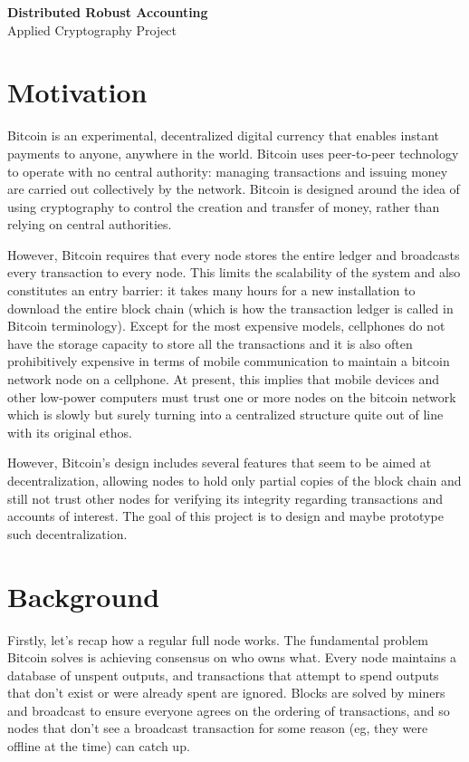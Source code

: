 \documentclass[a4paper,12pt]{article}
\begin{document}
\pagestyle{empty}
\begin{center}
\LARGE{\textbf{Distributed Robust Accounting}}\\
\vspace{0.5cm}
\large{Applied Cryptography Project}\\
\vspace{1cm}
\end{center}

\section{Motivation}
Bitcoin is an experimental, decentralized digital currency that enables instant payments to anyone, anywhere in the world. Bitcoin uses peer-to-peer technology to operate with no central authority: managing transactions and issuing money are carried out collectively by the network.
Bitcoin is designed around the idea of using cryptography to control the creation and transfer of money, rather than relying on central authorities.

However, Bitcoin requires that every node stores the entire ledger and broadcasts
every transaction to every node. This limits the scalability of the system and also constitutes
an entry barrier: it takes many hours for a new installation to download the
entire block chain (which is how the transaction ledger is called in Bitcoin terminology).
Except for the most expensive models, cellphones do not have the storage capacity to
store all the transactions and it is also often prohibitively expensive in terms of mobile communication to maintain a bitcoin network node on a cellphone. At present, this implies
that mobile devices and other low-power computers must trust one or more nodes
on the bitcoin network which is slowly but surely turning into a centralized structure
quite out of line with its original ethos.

However, Bitcoin's design includes several features that seem to be aimed at decentralization,
allowing nodes to hold only partial copies of the block chain and still not trust
other nodes for verifying its integrity regarding transactions and accounts of interest. The
goal of this project is to design and maybe prototype such decentralization.

\section{Background}

Firstly, let's recap how a regular full node works. The fundamental problem Bitcoin solves is achieving consensus on who owns what. Every node maintains a database of unspent outputs, and transactions that attempt to spend outputs that don't exist or were already spent are ignored. Blocks are solved by miners and broadcast to ensure everyone agrees on the ordering of transactions, and so nodes that don't see a broadcast transaction for some reason (eg, they were offline at the time) can catch up.
\end{document}
